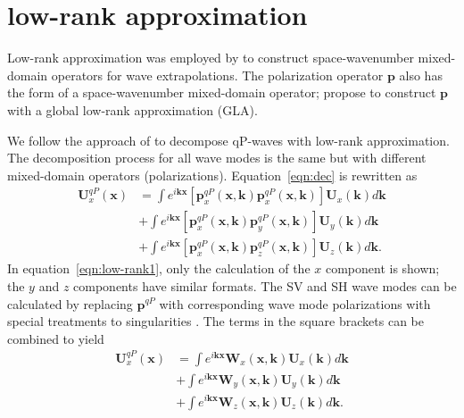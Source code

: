 \documentclass[manuscript,ulem,graphix,revised]{geophysics}
\begin{document}
\section{low-rank approximation}
\indent\indent
Low-rank approximation was  employed by \citet{fomel13} to construct space-wavenumber mixed-domain operators for wave extrapolations. The polarization operator $\boldsymbol{p}$ also has the form of a space-wavenumber mixed-domain operator; \citet{cheng14} propose to construct $\boldsymbol{p}$ with a global low-rank approximation (GLA).

We follow the approach of \citet{cheng14} to decompose qP-waves with low-rank approximation.
The decomposition process for all wave modes is the same but with different mixed-domain operators (polarizations).
Equation~\ref{eqn:dec} is rewritten as
\begin{equation}
\begin{split}
\mathbf{U}^{qP}_x(\mathbf{x})&=\int e^{i\mathbf{kx}}[\mathbf{p}^{qP}_{x}(\mathbf{x,k})\mathbf{p}^{qP}_{x}(\mathbf{x,k})]\mathbf{U}_x(\mathbf{k})d\mathbf{k}\\
                    &+\int e^{i\mathbf{kx}}[\mathbf{p}^{qP}_{x}(\mathbf{x,k})\mathbf{p}^{qP}_{y}(\mathbf{x,k})]\mathbf{U}_y(\mathbf{k})d\mathbf{k} \\
                    &+\int e^{i\mathbf{kx}}[\mathbf{p}^{qP}_{x}(\mathbf{x,k})\mathbf{p}^{qP}_{z}(\mathbf{x,k})]\mathbf{U}_z(\mathbf{k})d\mathbf{k}. 
\end{split}
\label{eqn:low-rank1}
\end{equation}
In equation~\ref{eqn:low-rank1}, only the calculation of the $x$ component is shown; the $y$ and $z$ components have similar formats. The SV and SH wave modes can be calculated by replacing $\mathbf{p}^{qP}$ with corresponding wave mode polarizations with special treatments to singularities 
\citep{cheng14,Sripanich16}. 
The terms in the square brackets can be combined to yield
\begin{equation}
\begin{split}
\mathbf{U}^{qP}_x(\mathbf{x})&=\int e^{i\mathbf{kx}}\mathbf{W}_x(\mathbf{x,k})\mathbf{U}_x(\mathbf{k})d\mathbf{k} \\
                    &+\int e^{i\mathbf{kx}}\mathbf{W}_y(\mathbf{x,k})\mathbf{U}_y(\mathbf{k})d\mathbf{k}\\
                    &+\int e^{i\mathbf{kx}}\mathbf{W}_z(\mathbf{x,k})\mathbf{U}_z(\mathbf{k})d\mathbf{k}. 
\end{split}
\label{eqn:low-rank2}
\end{equation}
\end{document}
